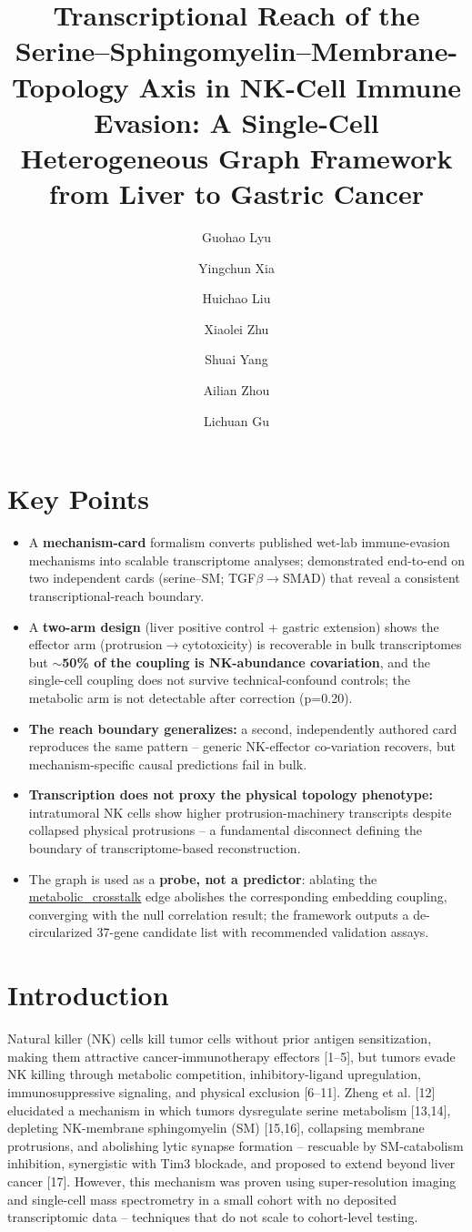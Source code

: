 \documentclass[modern,large,numbered,nocrop]{oup-authoring-template}
\title[Transcriptional reach of the NK serine--SM--topology axis]{Transcriptional Reach of the Serine--Sphingomyelin--Membrane-Topology Axis in NK-Cell Immune Evasion: A Single-Cell Heterogeneous Graph Framework from Liver to Gastric Cancer}
\author[1,2]{Guohao Lyu}
\author[1,2]{Yingchun Xia}
\author[1,2]{Huichao Liu}
\author[1,2]{Xiaolei Zhu}
\author[1,2]{Shuai Yang}
\author[3,4,*]{Ailian Zhou}
\author[1,2,*]{Lichuan Gu}
\begin{document}
\maketitle
\enlargethispage{3\baselineskip}%

\section*{Key Points}
\begin{itemize}
\item A \textbf{mechanism-card} formalism converts published wet-lab immune-evasion mechanisms into scalable transcriptome analyses; demonstrated end-to-end on two independent cards (serine--SM; TGF$\beta$$\to$SMAD) that reveal a consistent transcriptional-reach boundary.
\item A \textbf{two-arm design} (liver positive control + gastric extension) shows the effector arm (protrusion$\to$cytotoxicity) is recoverable in bulk transcriptomes but \textbf{$\sim$50\% of the coupling is NK-abundance covariation}, and the single-cell coupling does not survive technical-confound controls; the metabolic arm is not detectable after correction (p=0.20).
\item \textbf{The reach boundary generalizes:} a second, independently authored card reproduces the same pattern -- generic NK-effector co-variation recovers, but mechanism-specific causal predictions fail in bulk.
\item \textbf{Transcription does not proxy the physical topology phenotype:} intratumoral NK cells show higher protrusion-machinery transcripts despite collapsed physical protrusions -- a fundamental disconnect defining the boundary of transcriptome-based reconstruction.
\item The graph is used as a \textbf{probe, not a predictor}: ablating the \url{metabolic_crosstalk} edge abolishes the corresponding embedding coupling, converging with the null correlation result; the framework outputs a de-circularized 37-gene candidate list with recommended validation assays.
\end{itemize}

\section{Introduction}

Natural killer (NK) cells kill tumor cells without prior antigen sensitization, making them attractive cancer-immunotherapy effectors [1--5], but tumors evade NK killing through metabolic competition, inhibitory-ligand upregulation, immunosuppressive signaling, and physical exclusion [6--11]. Zheng et al. [12] elucidated a mechanism in which tumors dysregulate serine metabolism [13,14], depleting NK-membrane sphingomyelin (SM) [15,16], collapsing membrane protrusions, and abolishing lytic synapse formation -- rescuable by SM-catabolism inhibition, synergistic with Tim3 blockade, and proposed to extend beyond liver cancer [17]. However, this mechanism was proven using super-resolution imaging and single-cell mass spectrometry in a small cohort with no deposited transcriptomic data -- techniques that do not scale to cohort-level testing.
\end{document}
